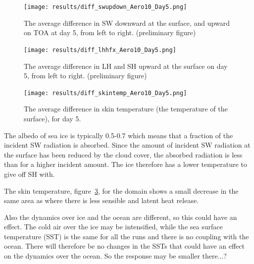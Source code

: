 \begin{figure}[h!]
\centering
\texttt{[image: results/diff\_swupdown\_Aero10\_Day5.png]}
\caption{The average difference in SW downward at the surface, and upward on TOA at day 5, from left to right. (preliminary figure)}
\label{fig:swup_down_r3Day5}
\end{figure}

\begin{figure}[h!]
\centering
\texttt{[image: results/diff\_lhhfx\_Aero10\_Day5.png]}
\caption{The average difference in LH and SH upward at the surface on day 5, from left to right. (preliminary figure)}
\label{fig:lhhfx_r3Day5}
\end{figure}

\begin{figure}[h!]
\centering
\texttt{[image: results/diff\_skintemp\_Aero10\_Day5.png]}
\caption{The average difference in skin temperature (the temperature of the surface), for day 5.}
\label{fig:skintemp_r3Day5}
\end{figure}
The albedo of sea ice is typically 0.5-0.7 which means that a fraction of the incident SW radiation is absorbed. Since the amount of incident SW radiation at the surface has been reduced by the cloud cover, the absorbed radiation is less than for a higher incident amount. The ice therefore has a lower temperature to give off SH with. 

The skin temperature, figure~\ref{fig:skintemp_r3Day5}, for the domain shows a small decrease in the same area as where there is less sensible and latent heat release.

Also the dynamics over ice and the ocean are different, so this could have an effect. The cold air over the ice may be intensified, while the sea surface temperature (SST) is the same for all the runs and there is no coupling with the ocean. There will therefore be no changes in the SSTs that could have an effect on the dynamics over the ocean. So the response may be smaller there...?




